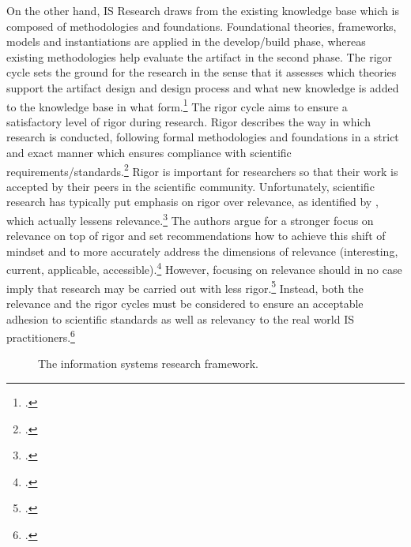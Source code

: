 On the other hand, IS Research draws from the existing knowledge base which is composed of methodologies and foundations. Foundational theories, frameworks, models and instantiations are applied in the develop/build phase, whereas existing methodologies help evaluate the artifact in the second phase. The rigor cycle sets the ground for the research in the sense that it assesses which theories support the artifact design and design process and what new knowledge is added to the knowledge base in what form.\footcite[Cf.][p.19]{HevnerDesignResearchInformation2010} The rigor cycle aims to ensure a satisfactory level of rigor during research. Rigor describes the way in which research is conducted, following formal methodologies and foundations in a strict and exact manner which ensures compliance with scientific requirements/standards.\footcite[Cf.][p.88]{HevnerDesignScienceResearch2004} Rigor is important for researchers so that their work is accepted by their peers in the scientific community. Unfortunately, scientific research has typically put emphasis on rigor over relevance, as identified by \cite{BenbasatEmpiricalresearchinformation1999}, which actually lessens relevance.\footcites[Cf.][p.88]{HevnerDesignResearchInformation2010}[cf.][p.5]{BenbasatEmpiricalresearchinformation1999} The authors argue for a stronger focus on relevance on top of rigor and set recommendations how to achieve this shift of mindset and to more accurately address the dimensions of relevance (interesting, current, applicable, accessible).\footcite[Cf.][pp.5,8-14]{BenbasatEmpiricalresearchinformation1999} However, focusing on relevance should in no case imply that research may be carried out with less rigor.\footcite[Cf.][p.5]{BenbasatEmpiricalresearchinformation1999} Instead, both the relevance and the rigor cycles must be considered to ensure an acceptable adhesion to scientific standards as well as relevancy to the real world IS practitioners.\footcite[Cf.][p.130]{ThomasBekannteundweniger2014}

\begin{figure}
    \centering
    
    \caption[The information systems research framework]{The information systems research framework.\footnotemark}
    \label{fig:ISRFramework}
\end{figure}

